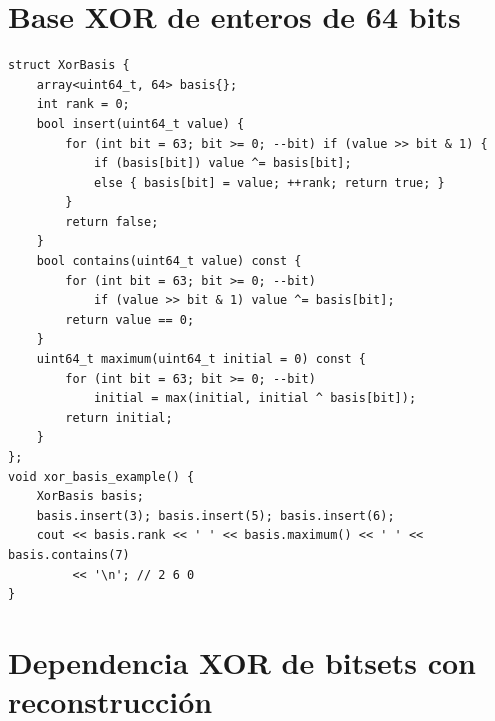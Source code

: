 \section{Base XOR de enteros de 64 bits}

\begin{lstlisting}[style=cpp]
struct XorBasis {
    array<uint64_t, 64> basis{};
    int rank = 0;
    bool insert(uint64_t value) {
        for (int bit = 63; bit >= 0; --bit) if (value >> bit & 1) {
            if (basis[bit]) value ^= basis[bit];
            else { basis[bit] = value; ++rank; return true; }
        }
        return false;
    }
    bool contains(uint64_t value) const {
        for (int bit = 63; bit >= 0; --bit)
            if (value >> bit & 1) value ^= basis[bit];
        return value == 0;
    }
    uint64_t maximum(uint64_t initial = 0) const {
        for (int bit = 63; bit >= 0; --bit)
            initial = max(initial, initial ^ basis[bit]);
        return initial;
    }
};
void xor_basis_example() {
    XorBasis basis;
    basis.insert(3); basis.insert(5); basis.insert(6);
    cout << basis.rank << ' ' << basis.maximum() << ' ' << basis.contains(7)
         << '\n'; // 2 6 0
}
\end{lstlisting}

\section{Dependencia XOR de bitsets con reconstrucci\'on}

